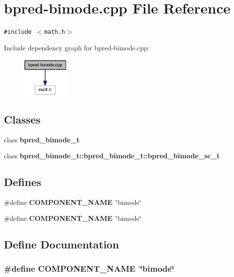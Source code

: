 \section{bpred-bimode.cpp File Reference}
\label{bpred-bimode_8cpp}
{\tt \#include $<$math.h$>$}\par


Include dependency graph for bpred-bimode.cpp:\nopagebreak
\begin{figure}[H]
\begin{center}
\leavevmode
\includegraphics[width=68pt]{bpred-bimode_8cpp__incl}
\end{center}
\end{figure}
\subsection*{Classes}
\begin{CompactItemize}
\item 
class {\bf bpred\_\-bimode\_\-t}
\item 
class {\bf bpred\_\-bimode\_\-t::bpred\_\-bimode\_\-t::bpred\_\-bimode\_\-sc\_\-t}
\end{CompactItemize}
\subsection*{Defines}
\begin{CompactItemize}
\item 
\#define {\bf COMPONENT\_\-NAME}~\char`\"{}bimode\char`\"{}
\item 
\#define {\bf COMPONENT\_\-NAME}~\char`\"{}bimode\char`\"{}
\end{CompactItemize}


\subsection{Define Documentation}
\subsubsection[{COMPONENT\_\-NAME}]{\setlength{\rightskip}{0pt plus 5cm}\#define COMPONENT\_\-NAME~\char`\"{}bimode\char`\"{}}\label{zesto-bpred_8cpp_9146ade7ce24e3db226a973a59063892}


